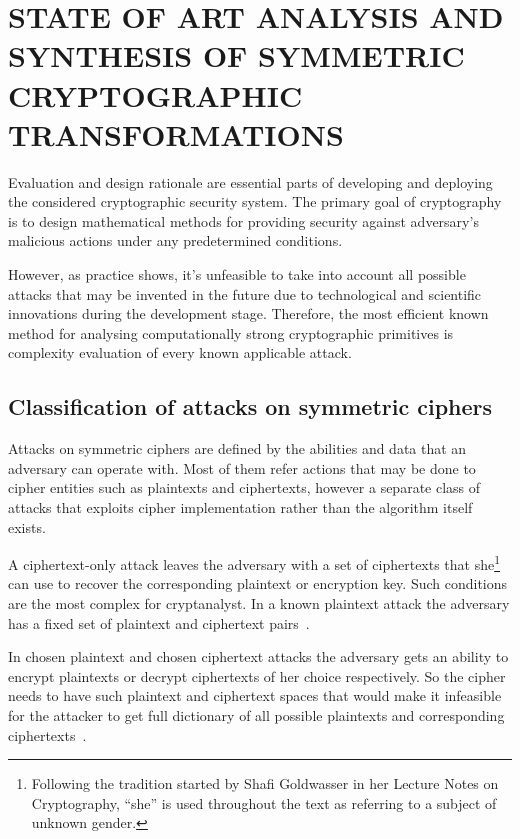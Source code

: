 
\chapter{STATE OF ART ANALYSIS AND SYNTHESIS OF SYMMETRIC CRYPTOGRAPHIC TRANSFORMATIONS}
\label{sec:symmetry_review}

Evaluation and design rationale are essential parts of developing and
deploying  the considered cryptographic security system. The primary goal of
cryptography is to design mathematical methods for providing security against
adversary's malicious actions under any predetermined conditions.

However, as practice shows, it's unfeasible to take into account all possible
attacks that may be invented in the future due to technological and scientific
innovations during the development stage. Therefore, the most efficient known
method for analysing computationally strong cryptographic primitives is
complexity evaluation of every known applicable attack.

\section{Classification of attacks on symmetric ciphers}

Attacks on symmetric ciphers are defined by the abilities and data
that an adversary can operate with. Most of them refer actions that may be
done to cipher entities such as plaintexts and ciphertexts, however a separate
class of attacks that exploits cipher implementation rather than the
algorithm itself exists.

A ciphertext-only attack leaves the adversary with a set of ciphertexts that
she\footnote{Following the tradition started by Shafi Goldwasser in her Lecture
Notes on Cryptography, ``she'' is used throughout the text as referring to a
subject of unknown gender.} can use to recover the corresponding
plaintext or encryption key. Such conditions are the most complex for
cryptanalyst. In a known plaintext attack the adversary has a fixed set of
plaintext and ciphertext pairs~\cite{menezes:applied_cryptography}.

In chosen plaintext and chosen ciphertext attacks the adversary gets an
ability to encrypt plaintexts or decrypt ciphertexts of her choice
respectively. So the cipher needs to have such plaintext and ciphertext
spaces that would make it infeasible for the attacker to get full dictionary of
all possible plaintexts and corresponding
ciphertexts~\cite{menezes:applied_cryptography}. 

